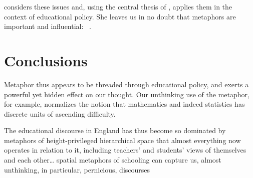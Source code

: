  considers these issues and, using the central
thesis of , applies them in the context of
educational policy.  She leaves us in no doubt that metaphors are
important and influential: ~\parencite[page 5]{sfard1998}.

\section{Conclusions}

Metaphor thus appears to be threaded through educational policy, and
exerts a powerful yet hidden effect on our thought.  Our unthinking
use of the  metaphor, for example, normalizes the
notion that mathematics and indeed statistics has discrete units of
ascending difficulty.





\begin{singlespace}
\epigraph{The educational discourse in England has thus become so
  dominated by metaphors of height-privileged hierarchical space that
  almost everything now operates in relation to it, including
  teachers' and students' views of themselves and each other\ldots
  spatial metaphors of schooling can capture us, almost unthinking, in
  particular, pernicious, discourses}{}
\end{singlespace}
